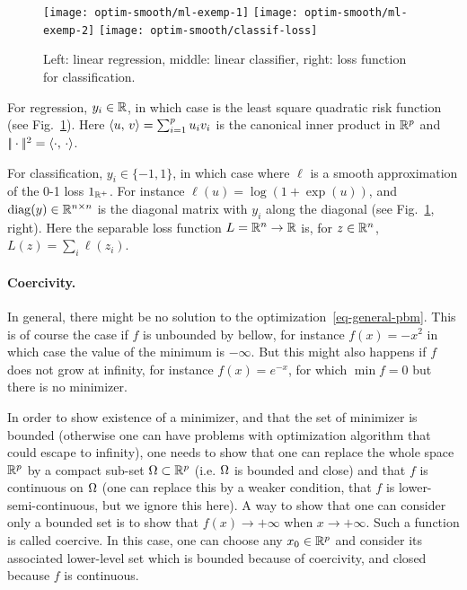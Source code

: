\begin{figure}
\centering
\texttt{[image: optim-smooth/ml-exemp-1]} \quad
\texttt{[image: optim-smooth/ml-exemp-2]} \quad
\texttt{[image: optim-smooth/classif-loss]}
\caption{\label{fig-ml-ex}
Left: linear regression, middle: linear classifier, right: loss function for classification.
}
\end{figure}

\begin{exmp}[Regression]
For regression, $y_i \in \mathbb{R}$, in which case
is the least square quadratic risk function (see Fig.~\ref{fig-ml-ex}).
%
Here $\langle u,\,v\rangle=\sum_{i=1}^p u_i v_i$ is the canonical inner product in $\mathbb{R}^p$ and $|\!| \cdot |\!|^2=\langle \cdot,\,\cdot\rangle$. 
\end{exmp}

\begin{exmp}[Classification]
For classification, $y_i \in \{-1,1\}$, in which case
where $\ell$ is a smooth approximation of the 0-1 loss $1_{\mathbb{R}^+}$.
%
For instance $\ell(u)=\log(1+\exp(u))$, and $\operatorname{diag}(y) \in \mathbb{R}^{n \times n}$ is the diagonal matrix with $y_i$ along the diagonal (see Fig.~\ref{fig-ml-ex}, right). Here the separable loss function $L = \mathbb{R}^n \rightarrow \mathbb{R}$ is, for $z \in \mathbb{R}^n$, $L(z)=\sum_i \ell(z_i)$. 
\end{exmp}

\paragraph{Coercivity.}

In general, there might be no solution to the optimization~\eqref{eq-general-pbm}. This is of course the case if $f$ is unbounded by bellow, for instance $f(x)=-x^2$ in which case the value of the minimum is $-\infty$. But this might also happens if $f$ does not grow at infinity, for instance $f(x)=e^{-x}$, for which $\min f = 0$ but there is no minimizer.

In order to show existence of a minimizer, and that the set of minimizer is bounded (otherwise one can have problems with optimization algorithm that could escape to infinity), one needs to show that one can replace the whole space $\mathbb{R}^p$ by a compact sub-set $\Omega \subset \mathbb{R}^p$ (i.e. $\Omega$ is bounded and close) and that $f$ is continuous on $\Omega$ (one can replace this by a weaker condition, that $f$ is lower-semi-continuous, but we ignore this here).  A way to show that one can consider only a bounded set is to show that $f(x) \rightarrow +\infty$ when $x \rightarrow +\infty$. Such a function is called coercive. In this case, one can choose any $x_0 \in \mathbb{R}^p$ and consider its associated lower-level set
which is bounded because of coercivity, and closed because $f$ is continuous.

